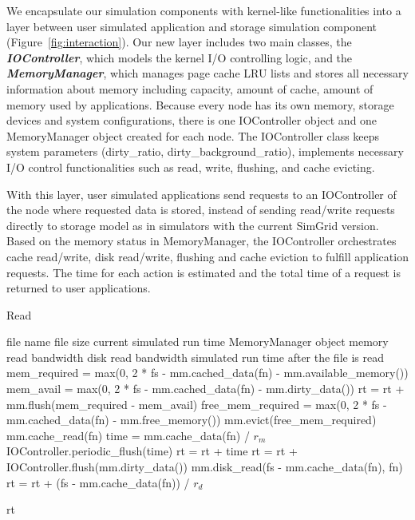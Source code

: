 \documentclass[conference]{IEEEtran}
\newcommand{\Desc}[2]{\State \makebox[2em][l]{#1}#2}
\begin{document}
			We encapsulate our simulation components with kernel-like functionalities 
			into a layer between user simulated application and storage simulation 
			component (Figure~\ref{fig:interaction}). Our new layer includes two main
			classes, the \textbf{\textit{IOController}}, which models the kernel 
			I/O controlling logic, and the \textbf{\textit{MemoryManager}}, which 
			manages page cache LRU lists and stores all necessary information about 
			memory including capacity, amount of cache, amount of memory used 
			by applications. Because every node has its own memory, storage devices 
			and system configurations, there is one IOController object and one 
			MemoryManager object created for each node. The IOController class 
			keeps system parameters (dirty{\_}ratio, dirty{\_}background{\_}ratio), 
			implements necessary I/O control functionalities such as read, write,
			flushing, and cache evicting. 

			With this layer, user simulated applications send requests to an 
			IOController of the node where requested data is stored, instead of 
			sending read/write requests directly to storage model as in simulators 
			with the current SimGrid version. Based on the memory status in 
			MemoryManager, the IOController orchestrates cache read/write, 
			disk read/write, flushing and cache eviction to fulfill application 
			requests. The time for each action is estimated and the total time of 
			a request is returned to user applications.
			
			\begin{algorithm}\caption{Read}\label{alg:read}
				\small
				\begin{algorithmic}[1]
					\Input
        				\Desc{fn}{file name}
        				\Desc{fs}{file size}
						\Desc{rt}{current simulated run time}
						\Desc{mm}{MemoryManager object}
						\Desc{$r_m$}{memory read bandwidth}
						\Desc{$r_d$}{disk read bandwidth}
   					\EndInput
   					\Output
						\Desc{rt}{simulated run time after the file is read}
   					\EndOutput
					\State mem\_required = max(0, 2 * fs - mm.cached\_data(fn) - 
					mm.available\_memory()) 
					\State mem\_avail = max(0, 2 * fs - mm.cached\_data(fn) - 
					mm.dirty\_data())
					\State rt = rt +  mm.flush(mem\_required - 
					mem\_avail)	
					\State free\_mem\_required = max(0, 2 * fs - mm.cached\_data(fn) - 
					mm.free\_memory())
					\State mm.evict(free\_mem\_required) 
    					\State mm.cache\_read(fn) 
    						\State time = mm.cache\_data(fn) / $r_m$
    						\State IOController.periodic\_flush(time) 
							\State rt = rt + time
						\EndIf
					\EndIf
						\State rt = rt + IOController.flush(mm.dirty\_data())
						\State mm.disk\_read(fs - mm.cache\_data(fn), fn)
    					\State rt = rt + (fs - mm.cache\_data(fn)) / $r_d$
					\EndIf					
					
					\Return rt
					
				\end{algorithmic}
			\end{algorithm}			
			
\end{document}
